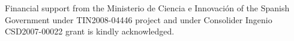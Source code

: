 
Financial support from the Ministerio de Ciencia e Innovaci\'{o}n of the Spanish Government under TIN2008-04446 project and under Consolider Ingenio CSD2007-00022 grant is kindly acknowledged. 

